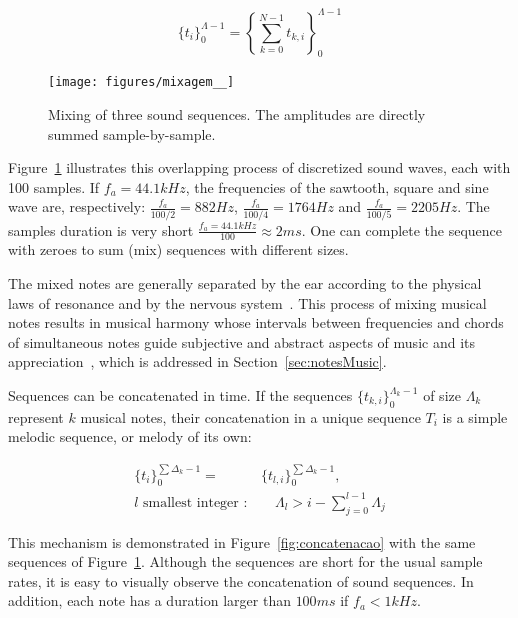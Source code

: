 \begin{equation}\label{eq:mixagem}
\{t_i\}_0^{\Lambda-1}=\left \{ \sum_{k=0}^{N-1}t_{k,i} \right \}_0^{\Lambda-1}
\end{equation}

\begin{figure}[h!]
    {\centering
        \texttt{[image: figures/mixagem\_\_]}}
    \caption{Mixing of three sound sequences. The amplitudes are directly summed sample-by-sample.}
        \label{fig:mixagem}
\end{figure}

Figure~\ref{fig:mixagem} illustrates this overlapping process of discretized sound waves, each with 100 samples. If $f_a=44.1kHz$, the frequencies of the sawtooth, square and sine wave are, respectively: $\frac{f_a}{100/2}=882Hz$, $\frac{f_a}{100/4}=1764Hz$ and $\frac{f_a}{100/5}=2205Hz$. The samples duration is very short $\frac{f_a=44.1kHz}{100} \approx 2ms$. One can complete the sequence with zeroes to sum (mix) sequences with different sizes.

The mixed notes are generally separated by the ear according to the physical laws of resonance and by the nervous system~\cite{Roederer}.  This process of mixing musical notes results in musical harmony whose intervals between frequencies and chords of simultaneous notes guide subjective and abstract aspects of music and its appreciation~\cite{Harmonia}, which is addressed in Section~\ref{sec:notesMusic}. 

Sequences can be concatenated in time. If the sequences $\{t_{k,i}\}_0^{\Lambda_k-1}$ of size $\Lambda_k$ represent $k$ musical notes, their concatenation in a unique sequence $T_i$ is a simple melodic sequence, or melody of its own:

\begin{equation}\label{eq:concatenacao}
\begin{split}
\{t_i\}_0^{\sum\Delta_k-1}= & \{t_{l,i}\}_0^{\sum\Delta_k-1}, \;\; \\ l\text{ smallest integer } : & \quad \Lambda_l > i -\sum_{j=0}^{l-1}\Lambda_j
\end{split}
\end{equation}

This mechanism is demonstrated in Figure~\ref{fig:concatenacao} with the same sequences of Figure~\ref{fig:mixagem}. Although the sequences are short for the usual sample rates, it is easy to visually observe the concatenation of sound sequences. In addition, each note has  a duration larger than $100ms$ if $f_a<1kHz$.

